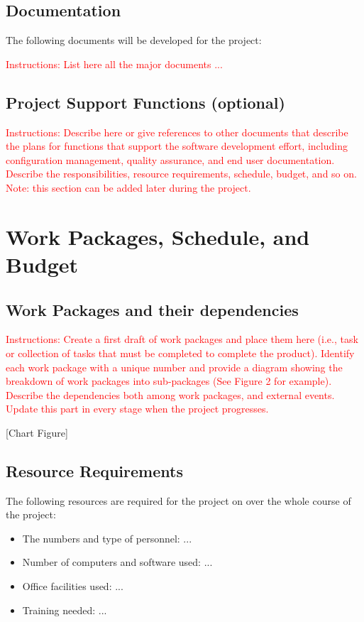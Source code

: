 \documentclass{article}
\begin{document}
\subsection{Documentation}
The following documents will be developed for the project:

\textcolor{red}{Instructions: List here all the major documents ...}

\subsection{Project Support Functions (optional)}
\textcolor{red}{
Instructions: Describe here or give references to other documents that describe
the plans for functions that support the software development effort, including
configuration management, quality assurance, and end user documentation.
Describe the responsibilities, resource requirements, schedule, budget, and so
on. Note: this section can be added later during the project.}

\section{Work Packages, Schedule, and Budget}
\subsection{Work Packages and their dependencies}
\textcolor{red}{Instructions: Create a first draft of work packages and place them here (i.e., task
or collection of tasks that must be completed to complete the product).
Identify each work package with a unique number and provide a diagram showing
the breakdown of work packages into sub-packages (See Figure 2 for example).
Describe the dependencies both among work packages, and external events.
Update this part in every stage when the project progresses.}

[Chart Figure]

\subsection{Resource Requirements}
The following resources are required for the project on over the whole course of
the project:
{\color{red}
\begin{itemize}
\item The numbers and type of personnel: ...
\item Number of computers and software used: ...
\item Office facilities used: ...
\item Training needed: ...
\end{itemize}
}
\end{document}
